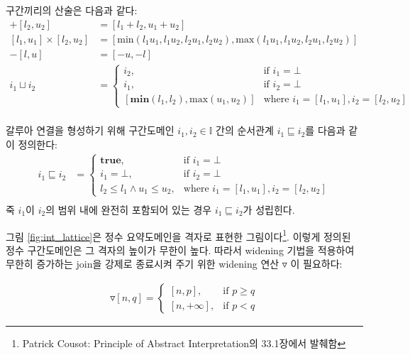 \documentclass[a4paper,12pt]{article}
\newcommand{\interval}[2]{[ #1, #2 ]}
\begin{document}
구간끼리의 산술은 다음과 같다:
\begin{align*}
	\interval{l_1}{u_1} + \interval{l_2}{u_2} &= \interval{l_1 + l_2}{u_1 + u_2} \\
	\interval{l_1}{u_1} \times \interval{l_2}{u_2} &= \interval{\mathrm{min}(l_1 u_1, l_1 u_2, l_2 u_1, l_2 u_2)}{\mathrm{max}(l_1 u_1, l_1 u_2, l_2 u_1, l_2 u_2)} \\
	-\interval{l}{u} &= \interval{-u}{-l} \\
	i_1 \sqcup i_2 &= 
	\begin{cases}
		i_2, & \text{if } i_1 = \bot \\
		i_1, & \text{if } i_2 = \bot \\
		\interval{\mathbf{min}(l_1, l_2)}{\mathrm{max}(u_1, u_2)} & \text{where } i_1 = \interval{l_1}{u_1}, i_2 = \interval{l_2}{u_2}
	\end{cases} \\
\end{align*}

갈루아 연결을 형성하기 위해 구간도메인 $i_1, i_2 \in \mathbb{I}$ 간의 순서관계 $i_1 \sqsubseteq i_2$를 다음과 같이 정의한다:
\begin{align*}
    i_1 \sqsubseteq i_2 &= 
	\begin{cases}
		\mathbf{true}, & \text{if } i_1 = \bot \\
		i_1 = \bot, & \text{if } i_2 = \bot \\
		l_2 \leq l_1 \wedge u_1 \leq u_2, & \text{where } i_1 = \interval{l_1}{u_1}, i_2 = \interval{l_2}{u_2}
	\end{cases} \\
\end{align*}
죽 $i_1$이 $i_2$의 범위 내에 완전히 포함되어 있는 경우 $i_1 \sqsubseteq i_2$가 성립힌다.

그림 \ref{fig:int_lattice}은 정수 요약도메인을 격자로 표현한 그림이다\footnote{Patrick Cousot: Principle of Abstract Interpretation의 33.1장에서 발췌함}.
이렇게 정의된 정수 구간도메인은 그 격자의 높이가 무한이 높다. 따라서 widening 기법을 적용하여 무한히 증가하는 join을 강제로 종료시켜 주기 위한 widening 연산 $\triangledown$ 이 필요하다:

\begin{align*}
    [n, p] \triangledown [n, q] = 
    \begin{cases}
        [n, p], & \text{if } p \geq q \\
        [n, +\infty], & \text{if } p < q
    \end{cases}
\end{align*}
\end{document}
